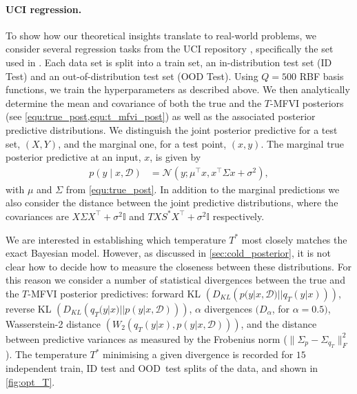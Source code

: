 \documentclass{article}
\theoremstyle{plain}
\theoremstyle{definition}
\theoremstyle{remark}
\theoremstyle{plain}
\newcommand{\I}{\mathbb{I}}
\newcommand{\data}{\mathcal{D}}
\newcommand{\KL}[2]{D_{KL}\left(#1||#2\right)}
\begin{document}
\paragraph{UCI regression.} To show how our theoretical insights translate to real-world problems, we consider several regression tasks from the UCI repository \citep{kelly2023uci}, specifically the set used in \citet{foong2019between}. Each data set is split into a train set, an in-distribution test set (ID Test)  and an out-of-distribution test set (OOD Test). Using $Q=500$ RBF basis functions, we train the hyperparameters as described above. We then analytically determine the mean and covariance of both the true and the $T$-MFVI posteriors (see \cref{equ:true_post,equ:t_mfvi_post}) as well as the associated posterior predictive distributions. We distinguish the joint posterior predictive for a test set, $(X, Y)$, and the marginal one, for a test point, $(x,y)$. The marginal true posterior predictive at an input, $x$, is given by
\begin{align}
    p(y \mid x, \mathcal{D})
    & = \mathcal{N}(y ; \mu^\top x, x^\top \Sigma x + \sigma^2 ),
\end{align}
with $\mu$ and $\Sigma$ from \cref{equ:true_post}. In addition to the marginal predictions we also consider the distance between the joint predictive distributions, where the covariances are $X\Sigma X^\top + \sigma^2 \I $ and $TX S^* X^\top + \sigma^2\I$ respectively.




We are interested in establishing which temperature $T^*$ most closely matches the exact Bayesian model. However, as discussed in \cref{sec:cold_posterior}, it is not clear how to decide how to measure the closeness between these distributions. For this reason we consider a number of statistical divergences between the true and the $T$-MFVI posterior predictives: forward KL $(\KL{p(y| x, \data)}{q_T(y| x )})$, reverse KL $(\KL{q_T(y| x )}{p(y| x, \data)})$, $\alpha$ divergences $(D_\alpha$, for $\alpha = 0.5)$, Wasserstein-2 distance $(W_2({q_T(y| x )},{p(y| x, \data)}))$, and the distance between predictive variances as measured by the Frobenius norm ($\|\Sigma_p - \Sigma_{q_T}\|_F^2$). The temperature  $T^*$ minimising a given divergence is recorded for $15$ independent train, ID test and OOD\ test splits of the data, and shown in \cref{fig:opt_T}. 
\end{document}
